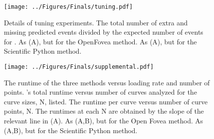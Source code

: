 \begin{figure}[htp]
\caption[Cross validation of algorithms and optimal parameters]{\noindent{} Details of tuning experiments.  The total number of extra and missing predicted events divided by the expected number of events for \name{}.  As (A), but for the OpenFovea method.  As (A), but for the Scientific Python method.  }
\centering
\texttt{[image: ../Figures/Finals/tuning.pdf]}%
\end{figure}



\begin{figure}
\caption[Algorithmic runtime versus loading rate]{\noindent{} The runtime of the three methods versus loading rate and number of points.  \name{}'s total runtime versus number of curves analyzed for the curve sizes, N, listed.  The runtime per curve versus number of curve points, N. The runtimes at each N are obtained by the slope of the relevant line in (A).   As (A,B), but for the Open Fovea method.  As (A,B), but for the Scientific Python method.  }
\centering
\texttt{[image: ../Figures/Finals/supplemental.pdf]}%
\end{figure}





%

%
